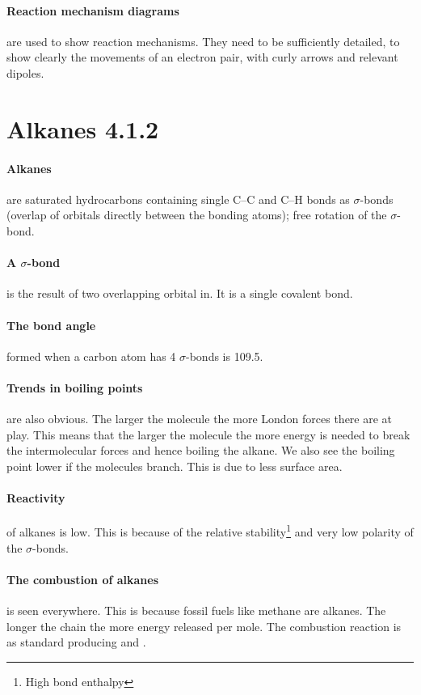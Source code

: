 	\paragraph{Reaction mechanism diagrams} are used to show reaction mechanisms.
	They need to be sufficiently detailed, to show clearly the movements of an electron pair, with curly arrows and relevant dipoles.
	
\section{Alkanes 4.1.2}
	
	\paragraph{Alkanes} are saturated hydrocarbons containing single C–C and C–H bonds as $\sigma$-bonds (overlap of orbitals directly between the bonding atoms); free rotation of the $\sigma$-bond.
	
	\paragraph{A $\sigma$-bond} is the result of two overlapping orbital in.
	It is a single covalent bond.
	
	\paragraph{The bond angle} formed when a carbon atom has 4 $\sigma$-bonds is 109.5\degree .
	
	\paragraph{Trends in boiling points} are also obvious.
	The larger the molecule the more London forces there are at play.
	This means that the larger the molecule the more energy is needed to break the intermolecular forces and hence boiling the alkane.
	We also see the boiling point lower if the molecules branch. This is due to less surface area.
	
	\paragraph{Reactivity} of alkanes is low.
	This is because of the relative stability\footnote{High bond enthalpy} and very low polarity of the $\sigma$-bonds. 
	
	\paragraph{The combustion of alkanes} is seen everywhere.
	This is because fossil fuels like methane are alkanes.
	The longer the chain the more energy released per mole.
	The combustion reaction is as standard producing  and .
	
